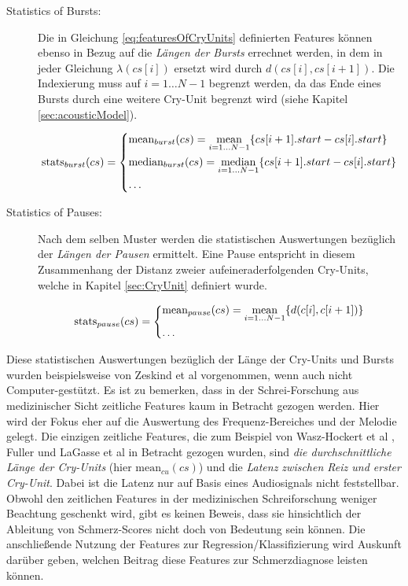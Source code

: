 \begin{description}
\item[Statistics of Bursts:] Die in Gleichung \ref{eq:featuresOfCryUnits} definierten Features können ebenso in Bezug auf die \emph{Längen der Bursts} errechnet werden, in dem in jeder Gleichung $\lambda(cs[i])$ ersetzt wird durch $d(cs[i], cs[i+1])$. Die Indexierung muss auf $i = 1 \ldots N-1$ begrenzt werden, da das Ende eines Bursts durch eine weitere Cry-Unit begrenzt wird (siehe Kapitel \ref{sec:acousticModel}). 

\begin{equation}
\text{stats}_{burst}(cs) = 
\begin{dcases}
\text{mean}_{burst}(cs) = \operatorname*{mean}_{i = 1 \ldots N-1}\{cs[i+1].start - cs[i].start\} \\
\text{median}_{burst}(cs) = \operatorname*{median}_{i = 1 \ldots N-1}\{cs[i+1].start - cs[i].start\} \\
\ldots
\end{dcases}
\label{eq:featuresOfCryUnits}
\end{equation}

\item[Statistics of Pauses:] Nach dem selben Muster werden die statistischen Auswertungen bezüglich der  \emph{Längen der Pausen} ermittelt. Eine Pause entspricht in diesem Zusammenhang der Distanz zweier aufeineraderfolgenden Cry-Units, welche in Kapitel \ref{sec:CryUnit} definiert wurde.

\begin{equation}
\text{stats}_{pause}(cs) = 
\begin{dcases}
\text{mean}_{pause}(cs) = \operatorname*{mean}_{i = 1 \ldots N-1}\{d(c[i],c[i+1])\} \\
\ldots
\end{dcases}
\label{eq:featuresOfCryUnits}
\end{equation}

\end{description}

Diese statistischen Auswertungen bezüglich der Länge der Cry-Units und Bursts wurden beispielsweise von Zeskind et al \cite{rythmic} vorgenommen, wenn auch nicht Computer-gestützt. Es ist zu bemerken, dass in der Schrei-Forschung aus medizinischer Sicht zeitliche Features kaum in Betracht gezogen werden. Hier wird der Fokus eher auf die Auswertung des Frequenz-Bereiches und der Melodie gelegt. Die einzigen zeitliche Features, die zum Beispiel von Wasz-Hockert et al \cite{25years}, Fuller \cite{threeCryTypes} und LaGasse et al\cite{parentalPerception} in Betracht gezogen wurden, sind \emph{die durchschnittliche Länge der Cry-Units} (hier $\text{mean}_{cu}(cs)$) und die \emph{Latenz zwischen Reiz und erster Cry-Unit}. Dabei ist die Latenz nur auf Basis eines Audiosignals nicht feststellbar. Obwohl den zeitlichen Features in der medizinischen Schreiforschung weniger Beachtung geschenkt wird, gibt es keinen Beweis, dass sie hinsichtlich der Ableitung von Schmerz-Scores nicht doch von Bedeutung sein können. Die anschließende Nutzung der Features zur Regression/Klassifizierung wird Auskunft darüber geben, welchen Beitrag diese Features zur Schmerzdiagnose leisten können.

